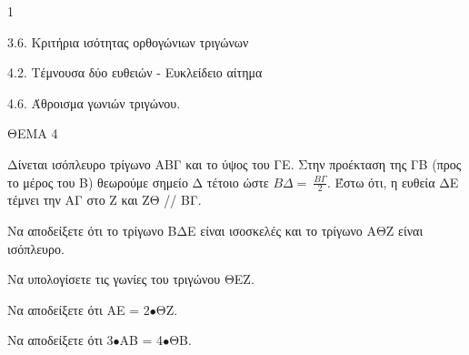 \begin{ylh}{1}
    \item 3.6. Κριτήρια ισότητας ορθογώνιων τριγώνων
    \item 4.2. Τέμνουσα δύο ευθειών - Ευκλείδειο αίτημα
    \item 4.6. Άθροισμα γωνιών τριγώνου.
\end{ylh}

ΘΕΜΑ 4

Δίνεται ισόπλευρο τρίγωνο ΑΒΓ και το ύψος του ΓΕ. Στην προέκταση της ΓΒ (προς το μέρος του Β) θεωρούμε σημείο Δ τέτοιο ώστε $Β\Delta = \ \frac{Β\Gamma}{2}$. Έστω ότι, η ευθεία ΔΕ τέμνει την ΑΓ στο Ζ και ΖΘ // ΒΓ.

\begin{alist}
\item Να αποδείξετε ότι το τρίγωνο ΒΔΕ είναι ισοσκελές και το τρίγωνο ΑΘΖ είναι ισόπλευρο. 

\item Να υπολογίσετε τις γωνίες του τριγώνου ΘΕΖ. 

\item Να αποδείξετε ότι ΑΕ = 2$\bullet$ΘΖ. 

\item Να αποδείξετε ότι 3$\bullet$ΑΒ = 4$\bullet$ΘΒ. 


\end{alist}
